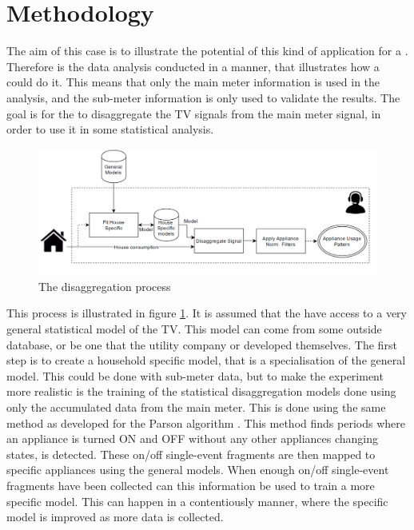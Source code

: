\section{Methodology}
The aim of this case is to illustrate the potential of this kind of application for a . Therefore is the data analysis conducted in a manner, that illustrates how a  could do it. This means that only the main meter information is used in the analysis, and the sub-meter information is only used to validate the results.  The goal is for the  to disaggregate the TV signals from the main meter signal, in order to use it in some statistical analysis. 

\begin{figure}[H]
\centering
\includegraphics[width=1\textwidth]{billeder/Electric company method.png}
\caption{The disaggregation process}
\label{fig:ECM}
\end{figure}

This process is illustrated in figure \ref{fig:ECM}. It is assumed that the  have access to a very general statistical model of the TV. This model can come from some outside database, or be one that the utility company or  developed themselves. The first step is to create a household specific model, that is a specialisation of the general model. This could be done with sub-meter data, but to make the experiment more realistic is the training of the statistical disaggregation models done using only the accumulated data from the main meter. This is done using the same method as developed for the Parson algorithm \citep{RefWorks:28}. This method finds periods where an appliance is turned ON and OFF without any other appliances changing states, is detected. These on/off single-event fragments are then mapped to specific appliances using the general models. When enough on/off single-event fragments have been collected can this information be used to train a more specific model. This can happen in a contentiously manner, where the specific model is improved as more data is collected.  

